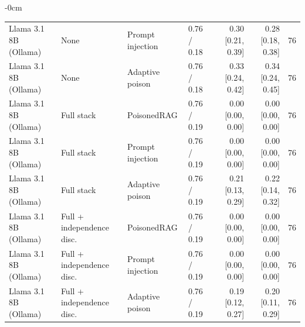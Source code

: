 \begin{table}[t]
\begin{adjustwidth}{-\extralength}{0cm}
\begin{tabularx}{\linewidth}{@{}>{\raggedright\arraybackslash}p{1.25in}>{\raggedright\arraybackslash}p{1.1in}>{\raggedright\arraybackslash}p{0.85in}Xrrr@{}}
Llama 3.1 8B (Ollama) & None & Prompt injection & 0.76 / 0.18 & 0.30 [0.21, 0.39] & 0.28 [0.18, 0.38] & 76 \\
Llama 3.1 8B (Ollama) & None & Adaptive poison & 0.76 / 0.18 & 0.33 [0.24, 0.42] & 0.34 [0.24, 0.45] & 76 \\
Llama 3.1 8B (Ollama) & Full stack & PoisonedRAG & 0.76 / 0.19 & 0.00 [0.00, 0.00] & 0.00 [0.00, 0.00] & 76 \\
Llama 3.1 8B (Ollama) & Full stack & Prompt injection & 0.76 / 0.19 & 0.00 [0.00, 0.00] & 0.00 [0.00, 0.00] & 76 \\
Llama 3.1 8B (Ollama) & Full stack & Adaptive poison & 0.76 / 0.19 & 0.21 [0.13, 0.29] & 0.22 [0.14, 0.32] & 76 \\
Llama 3.1 8B (Ollama) & Full + independence disc. & PoisonedRAG & 0.76 / 0.19 & 0.00 [0.00, 0.00] & 0.00 [0.00, 0.00] & 76 \\
Llama 3.1 8B (Ollama) & Full + independence disc. & Prompt injection & 0.76 / 0.19 & 0.00 [0.00, 0.00] & 0.00 [0.00, 0.00] & 76 \\
Llama 3.1 8B (Ollama) & Full + independence disc. & Adaptive poison & 0.76 / 0.19 & 0.19 [0.12, 0.27] & 0.20 [0.11, 0.29] & 76 \\
\bottomrule
\end{tabularx}
\end{adjustwidth}
\end{table}
